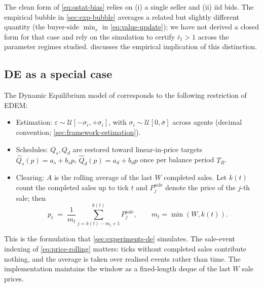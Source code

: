 The clean form of \cref{eq:ostat-bias} relies on (i) a single seller
and (ii) iid bids. The empirical bubble in
\cref{sec:exp-bubble} averages a related but slightly different
quantity (the buyer-side $\min_{s}$ in \cref{eq:value-update}); we
have not derived a closed form for that case and rely on the
simulation to certify $\bar{r}_{t} > 1$ across the parameter
regimes studied.  discusses the empirical
implication of this distinction.

\subsection{DE as a special case}
\label{sec:framework-de-special}

The Dynamic Equilibrium model of \citet{arbuzov2018de} corresponds to
the following restriction of EDEM:
\begin{itemize}[leftmargin=*,nosep]
\item Estimation: $\varepsilon \sim \mathcal{U}[-\sigma_{i}, +\sigma_{i}]$,
      with $\sigma_{i} \sim \mathcal{U}[0, \bar{\sigma}]$ across agents
      (decimal convention; \cref{sec:framework-estimation}).
\item Schedules: $Q_{s}, Q_{d}$ are restored toward linear-in-price
      targets $\hat{Q}_{s}(p) = a_{s} + b_{s} p$,
      $\hat{Q}_{d}(p) = a_{d} + b_{d} p$ once per balance period $T_{B}$.
\item Clearing: $A$ is the rolling average of the last $W$ completed
      sales. Let $k(t)$ count the completed sales up to tick $t$ and
      $P^{\mathrm{sale}}_{j}$ denote the price of the $j$-th sale; then
      \begin{equation}
      \label{eq:price-rolling}
      p_{t} \;=\; \frac{1}{m_{t}} \sum_{j=k(t)-m_{t}+1}^{k(t)} P^{\mathrm{sale}}_{j},
      \qquad m_{t} = \min(W, k(t)).
      \end{equation}
\end{itemize}
This is the formulation that \cref{sec:experiments-de} simulates. The
sale-event indexing of \cref{eq:price-rolling} matters: ticks without
completed sales contribute nothing, and the average is taken over
realised events rather than time. The implementation maintains the
window as a fixed-length deque of the last $W$ sale prices.

